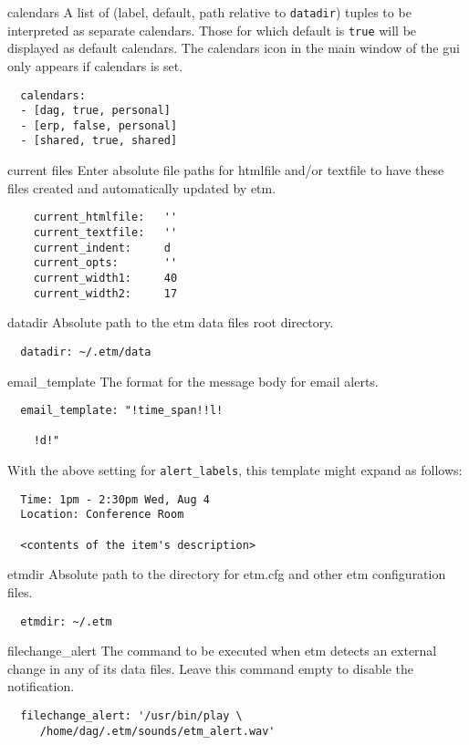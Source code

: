 \documentclass[10pt,landscape]{article}
\begin{document}
\begin{multicols}{3}
\begin{compactdesc}
\item[calendars] A list of (label, default, path relative to \verb!datadir!) tuples to be interpreted as separate calendars. Those for which default is \verb!true! will be displayed as default calendars. The calendars icon in the main window of the gui only appears if calendars is set.
\begin{verbatim}
  calendars:
  - [dag, true, personal]
  - [erp, false, personal]
  - [shared, true, shared]
\end{verbatim}

\item[current files] Enter absolute file paths for htmlfile and/or textfile to have these files created and automatically updated by etm.
\begin{verbatim}
    current_htmlfile:   ''
    current_textfile:   ''
    current_indent:     d
    current_opts:       ''
    current_width1:     40
    current_width2:     17
\end{verbatim}

\item[datadir] Absolute path to the etm data files root directory.
\begin{verbatim}
  datadir: ~/.etm/data
\end{verbatim}

\item[email\_template] The format for the message body for email alerts.
\begin{verbatim}
  email_template: "!time_span!!l!

    !d!"
\end{verbatim}
With the above setting for \verb'alert_labels', this template might expand as follows:
\begin{verbatim}
  Time: 1pm - 2:30pm Wed, Aug 4
  Location: Conference Room

  <contents of the item's description>
\end{verbatim}

\item[etmdir] Absolute path to the directory for etm.cfg and other etm configuration files.
\begin{verbatim}
  etmdir: ~/.etm
\end{verbatim}

\item[filechange\_alert] The command to be executed when etm detects an external change in any of its data files. Leave this command empty to disable the notification.
\begin{verbatim}
  filechange_alert: '/usr/bin/play \
     /home/dag/.etm/sounds/etm_alert.wav'
\end{verbatim}


\end{compactdesc}
\end{multicols}
\end{document}
